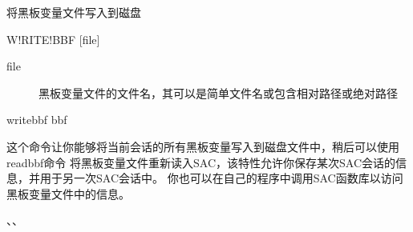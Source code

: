 \label{cmd:writebbf}

将黑板变量文件写入到磁盘

\begin{SACSTX}
W!RITE!BBF [file]
\end{SACSTX}

\begin{description}
\item [file] 黑板变量文件的文件名，其可以是简单文件名或包含相对路径或绝对路径
\end{description}

\begin{SACDFT}
writebbf bbf
\end{SACDFT}

这个命令让你能够将当前会话的所有黑板变量写入到磁盘文件中，稍后可以使用readbbf命令
将黑板变量文件重新读入SAC，该特性允许你保存某次SAC会话的信息，并用于另一次SAC会话中。
你也可以在自己的程序中调用SAC函数库以访问黑板变量文件中的信息。

、、
